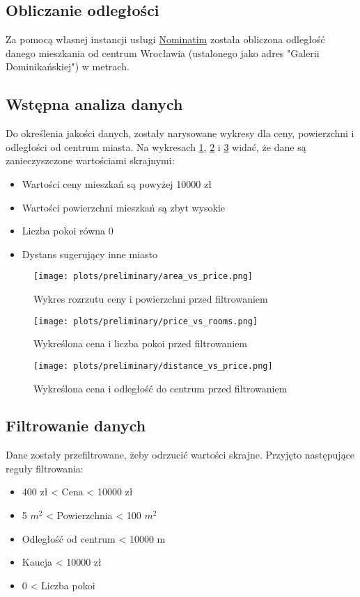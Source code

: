 \documentclass[12pt]{article}
\begin{document}
\subsection{Obliczanie odległości}
Za pomocą własnej instancji usługi \href{https://nominatim.org}{Nominatim} została obliczona odległość danego mieszkania od centrum Wrocławia (ustalonego jako adres "Galerii Dominikańskiej") w metrach.

\subsection{Wstępna analiza danych}
Do określenia jakości danych, zostały narysowane wykresy dla ceny, powierzchni i odległości od centrum miasta. Na wykresach \ref{fig:scatter_price_area}, \ref{fig:scatter_price_rooms} i \ref{fig:scatter_price_distance} widać, że dane są zanieczyszczone wartościami skrajnymi:
\begin{itemize}
  \item Wartości ceny mieszkań są powyżej 10000 zł 
  \item Wartości powierzchni mieszkań są zbyt wysokie
  \item Liczba pokoi równa 0
  \item Dystans sugerujący inne miasto
\end{itemize}

\begin{figure}[h]
  \centering
  \texttt{[image: plots/preliminary/area\_vs\_price.png]}
  \caption{Wykres rozrzutu ceny i powierzchni przed filtrowaniem}
  \label{fig:scatter_price_area}
\end{figure}

\begin{figure}[h]
  \centering
  \texttt{[image: plots/preliminary/price\_vs\_rooms.png]}
  \caption{Wykreślona cena i liczba pokoi przed filtrowaniem}
  \label{fig:scatter_price_rooms}
\end{figure}

\begin{figure}[h!]
  \centering
  \texttt{[image: plots/preliminary/distance\_vs\_price.png]}
  \caption{Wykreślona cena i odległość do centrum przed filtrowaniem}
  \label{fig:scatter_price_distance}
\end{figure}

\pagebreak
\subsection{Filtrowanie danych}
Dane zostały przefiltrowane, żeby odrzucić wartości skrajne. Przyjęto następujące reguły filtrowania:
  \begin{itemize}
    \item 400 zł < Cena < 10000 zł
    \item 5 $m^2$ < Powierzchnia < 100 $m^2$
    \item Odległość od centrum < 10000 m
    \item Kaucja < 10000 zł
    \item 0 < Liczba pokoi 
  \end{itemize}
\end{document}
